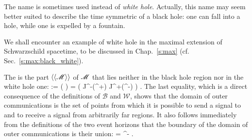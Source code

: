 \begin{remark}
The name  is sometimes used
instead of \emph{white hole}. Actually, this name may seem better suited
to describe the time symmetric of a black hole: one can fall into a hole, while
one is expelled by a fountain.
\end{remark}

\begin{example}
We shall encounter an example of white hole in the maximal extension of
Schwarzschild spacetime, to be discussed in Chap.~\ref{s:max} (cf. Sec.~\ref{s:max:black_white}).
\end{example}

The 
is the part $\langle\langle \mathscr{M}\rangle\rangle$ of $\mathscr{M}$ that lies neither
in the black hole region nor in the white hole one:
\be \label{e:glo:def_doc}
    \langle\langle \M\rangle\rangle := \M\setminus (\cup {} )
            = \left( J^-(\scri^+) \cap J^+(\scri^-) \right) \cap \M .
\ee
The last equality, which is a direct consequence of the definitions of
$\mathscr{B}$ and $\mathscr{W}$, shows that the domain of outer communications
is the set of points from which it is possible to send a signal to and to
receive a signal from arbitrarily far regions.
It also follows immediately from the definitions of the two event horizons
that the boundary of the domain of outer communications is their union:
\be
    \partial \langle\langle \M\rangle\rangle  = \Hor \cup \Hor^- .
\ee

